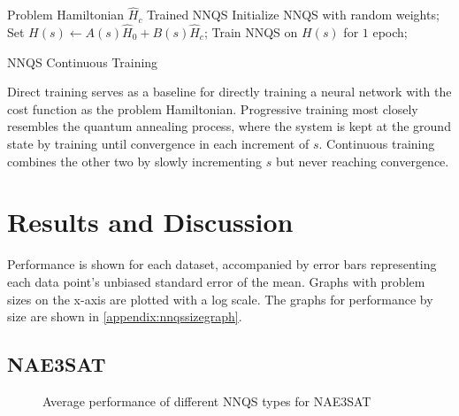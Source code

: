 \begin{algorithm}
    \begin{algorithmic}
    \Require Problem Hamiltonian $\hat{H}_c$
    \Ensure Trained NNQS
    \State Initialize NNQS with random weights;
    \State Set $H(s) \leftarrow A(s)\hat{H}_0 + B(s)\hat{H}_c$;
    \State Train NNQS on $H(s)$ for $1$ epoch;
    \EndFor
    \end{algorithmic}
    \caption{NNQS Continuous Training}
    \label{alg:continuous}
\end{algorithm}

Direct training serves as a baseline for directly training a neural network with the cost function as the problem Hamiltonian. Progressive training most closely resembles the quantum annealing process, where the system is kept at the ground state by training until convergence in each increment of $s$. Continuous training combines the other two by slowly incrementing $s$ but never reaching convergence.

\section{Results and Discussion}
Performance is shown for each dataset, accompanied by error bars representing each data point's unbiased standard error of the mean. Graphs with problem sizes on the x-axis are plotted with a log scale. The graphs for performance by size are shown in \autoref{appendix:nnqssizegraph}.

\subsection{NAE3SAT}

\begin{figure}[!htbp]
    \centering
    \hfill
    \caption{Average performance of different NNQS types for NAE3SAT}
    \label{nnqs-nae3sat-average}
\end{figure}

